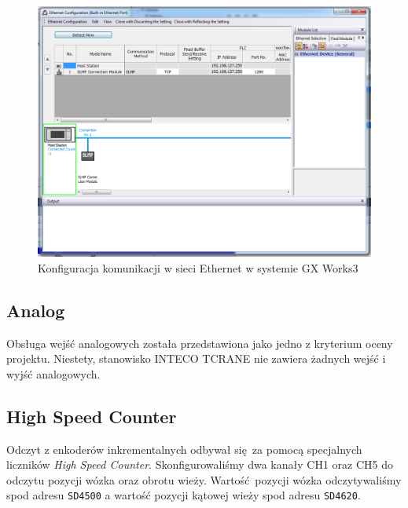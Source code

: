 \documentclass{mwrep}
\begin{document}
\begin{figure}[H]
    \label{PLC::Konfiguracja::Ethernet::Window}
    \centering
    \includegraphics[scale=0.3]{ethernet.png}
    \caption{Konfiguracja komunikacji w sieci Ethernet w systemie GX Works3}
\end{figure}

\subsection{Analog}
\label{PLC::Konfiguracja::Analog}

Obsługa wejść analogowych została przedstawiona jako jedno z kryterium oceny projektu.
Niestety, stanowisko INTECO TCRANE nie zawiera żadnych wejść i wyjść analogowych. 

\subsection{High Speed Counter}
\label{PLC::Konfiguracja::HIOEN}

Odczyt z enkoderów inkrementalnych odbywał się za pomocą specjalnych liczników \emph{High Speed
Counter}. Skonfigurowaliśmy dwa kanały CH1 oraz CH5 do odczytu pozycji wózka oraz obrotu wieży. 
Wartość pozycji wózka odczytywaliśmy spod adresu \texttt{SD4500} a wartość pozycji kątowej wieży 
spod adresu \texttt{SD4620}.

\newpage
\end{document}
